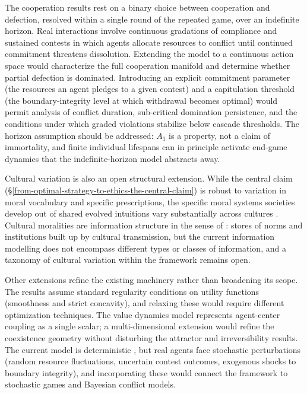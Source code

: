 \documentclass[11pt]{article}
\theoremstyle{plain}
\theoremstyle{definition}
\theoremstyle{remark}
\begin{document}
The cooperation results rest on a binary choice between cooperation and
defection, resolved within a single round of the repeated game, over an
indefinite horizon. Real interactions involve continuous gradations of
compliance and sustained contests in which agents allocate resources to
conflict until continued commitment threatens dissolution. Extending the
model to a continuous action space would characterize the full
cooperation manifold and determine whether partial defection is
dominated. Introducing an explicit commitment parameter (the resources
an agent pledges to a given contest) and a capitulation threshold (the
boundary-integrity level at which withdrawal becomes optimal) would
permit analysis of conflict duration, sub-critical domination
persistence, and the conditions under which graded violations stabilize
below cascade thresholds. The horizon assumption should be addressed:
\(A_1\) is a property, not a claim of immortality, and finite individual
lifespans can in principle activate end-game dynamics that the
indefinite-horizon model abstracts away.

Cultural variation is also an open structural extension. While the
central claim (§\ref{from-optimal-strategy-to-ethics-the-central-claim})
is robust to variation in moral vocabulary and specific prescriptions,
the specific moral systems societies develop out of shared evolved
intuitions vary substantially across cultures \citep{Haidt2010}.
Cultural moralities are information structure in the sense of
\citep{TC-III}: stores of norms and institutions built up by cultural
transmission, but the current information modelling does not encompass
different types or classes of information, and a taxonomy of cultural
variation within the framework remains open.

Other extensions refine the existing machinery rather than broadening
its scope. The results assume standard regularity conditions on utility
functions (smoothness and strict concavity), and relaxing these would
require different optimization techniques. The value dynamics model
\citep{TC-VI} represents agent-center coupling as a single scalar; a
multi-dimensional extension would refine the coexistence geometry
without disturbing the attractor and irreversibility results. The
current model is deterministic \citep{TC-IV}, but real agents face
stochastic perturbations (random resource fluctuations, uncertain
contest outcomes, exogenous shocks to boundary integrity), and
incorporating these would connect the framework to stochastic games and
Bayesian conflict models.
\end{document}
